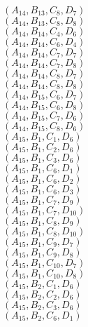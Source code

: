 \documentclass[14pt]{article}
\begin{document}
    $({A}_{14}, {B}_{13}, {C}_{8}, {D}_{7}) $ \\ 
    $({A}_{14}, {B}_{13}, {C}_{8}, {D}_{8}) $ \\ 
    $({A}_{14}, {B}_{14}, {C}_{4}, {D}_{6}) $ \\ 
    $({A}_{14}, {B}_{14}, {C}_{6}, {D}_{4}) $ \\ 
    $({A}_{14}, {B}_{14}, {C}_{7}, {D}_{7}) $ \\ 
    $({A}_{14}, {B}_{14}, {C}_{7}, {D}_{8}) $ \\ 
    $({A}_{14}, {B}_{14}, {C}_{8}, {D}_{7}) $ \\ 
    $({A}_{14}, {B}_{14}, {C}_{8}, {D}_{8}) $ \\ 
    $({A}_{14}, {B}_{15}, {C}_{6}, {D}_{7}) $ \\ 
    $({A}_{14}, {B}_{15}, {C}_{6}, {D}_{8}) $ \\ 
    $({A}_{14}, {B}_{15}, {C}_{7}, {D}_{6}) $ \\ 
    $({A}_{14}, {B}_{15}, {C}_{8}, {D}_{6}) $ \\ 
    $({A}_{15}, {B}_{1}, {C}_{1}, {D}_{6}) $ \\ 
    $({A}_{15}, {B}_{1}, {C}_{2}, {D}_{6}) $ \\ 
    $({A}_{15}, {B}_{1}, {C}_{3}, {D}_{6}) $ \\ 
    $({A}_{15}, {B}_{1}, {C}_{6}, {D}_{1}) $ \\ 
    $({A}_{15}, {B}_{1}, {C}_{6}, {D}_{2}) $ \\ 
    $({A}_{15}, {B}_{1}, {C}_{6}, {D}_{3}) $ \\ 
    $({A}_{15}, {B}_{1}, {C}_{7}, {D}_{9}) $ \\ 
    $({A}_{15}, {B}_{1}, {C}_{7}, {D}_{10}) $ \\ 
    $({A}_{15}, {B}_{1}, {C}_{8}, {D}_{9}) $ \\ 
    $({A}_{15}, {B}_{1}, {C}_{8}, {D}_{10}) $ \\ 
    $({A}_{15}, {B}_{1}, {C}_{9}, {D}_{7}) $ \\ 
    $({A}_{15}, {B}_{1}, {C}_{9}, {D}_{8}) $ \\ 
    $({A}_{15}, {B}_{1}, {C}_{10}, {D}_{7}) $ \\ 
    $({A}_{15}, {B}_{1}, {C}_{10}, {D}_{8}) $ \\ 
    $({A}_{15}, {B}_{2}, {C}_{1}, {D}_{6}) $ \\ 
    $({A}_{15}, {B}_{2}, {C}_{2}, {D}_{6}) $ \\ 
    $({A}_{15}, {B}_{2}, {C}_{3}, {D}_{6}) $ \\ 
    $({A}_{15}, {B}_{2}, {C}_{6}, {D}_{1}) $ \\ 
\end{document}
